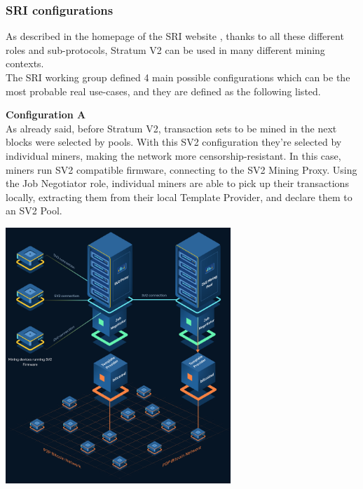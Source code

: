 \subsubsection{SRI configurations}
As described in the homepage of the SRI website \cite{stratumprotocolStratumV2}, thanks to all these different roles and sub-protocols, Stratum V2 can be used in many different mining contexts.\\
The SRI working group defined 4 main possible configurations which can be the most probable real use-cases, and they are defined as the following listed.
\begin{itemize}
    \begin{minipage}{.40\textwidth}
    \item \textbf{Configuration A}\label{configA}\\
     As already said, before Stratum V2, transaction sets to be mined in the next blocks were selected by pools. With this SV2 configuration they're selected by individual miners, making the network more censorship-resistant. In this case, miners run SV2 compatible firmware, connecting to the SV2 Mining Proxy. Using the Job Negotiator role, individual miners are able to pick up their transactions locally, extracting them from their local Template Provider, and declare them to an SV2 Pool.
    \end{minipage}
    \hspace{0.25cm}
    \begin{minipage}{.60\textwidth}
    \includegraphics[width=8.5cm]{Figures/sri/SRI_configA.png}
    \end{minipage}


\end{itemize}
